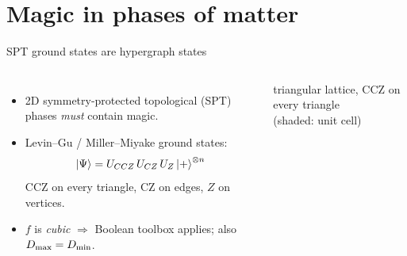 
\section{Magic in phases of matter}

\begin{frame}{SPT ground states are hypergraph states}
  \begin{columns}[c]
    \begin{itemize}
      \item 2D symmetry-protected topological (SPT) phases \emph{must} contain magic.
      \item Levin--Gu / Miller--Miyake ground states:
        \[\ket{\Psi}=U_{CCZ}\,U_{CZ}\,U_{Z}\ket{+}^{\otimes n}\]
        CCZ on every triangle, CZ on edges, $Z$ on vertices.
      \item $f$ is \emph{cubic} $\Rightarrow$ Boolean toolbox applies; also $D_{\max}=D_{\min}$.
    \end{itemize}
    \centering

    \small triangular lattice, CCZ on every triangle\\(shaded: unit cell)
  \end{columns}
\end{frame}

